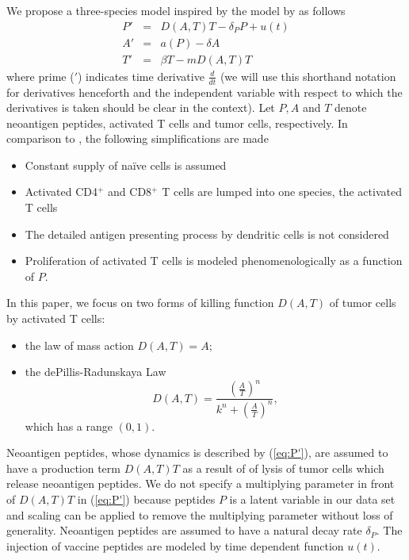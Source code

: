 \documentclass[review,authoryear]{elsarticle}
\begin{document}
We propose a three-species model inspired by the model by \cite{Messan2021} as follows
\begin{subequations}\label{eq:3sp-model}
\begin{eqnarray} 
P' & = & D(A,T)T-\delta_{P}P+u(t)\label{eq:P'}\\
A' & = & a(P)-\delta A\label{eq:A'}\\
T' & = & \beta T-mD(A,T)T\label{eq:T'}
\end{eqnarray}
\end{subequations}
where prime ($'$) indicates time derivative $\frac{d}{dt}$ (we will
use this shorthand notation for derivatives henceforth and the independent
variable with respect to which the derivatives is taken should be
clear in the context). Let $P, A$ and $T$ denote neoantigen peptides,
activated T cells and tumor cells, respectively. In comparison to \cite{Messan2021},
the following simplifications are made
\begin{itemize}
\item Constant supply of na\"ive cells is assumed 
\item Activated CD4$^{+}$ and CD8$^{+}$ T cells are lumped into one species, the activated T cells 
\item The detailed antigen presenting process by dendritic cells is not considered
\item Proliferation of activated T cells is modeled phenomenologically
as a function of $P$.
\end{itemize}

In this paper, we focus on two forms of killing function $D(A,T)$ of tumor cells by activated T cells:
\begin{itemize}
\item the law of mass action $D(A,T)=A$;
\item the dePillis-Radunskaya Law 
\begin{equation}
D(A,T)=\frac{(\frac{A}{T})^{n}}{k^{n}+(\frac{A}{T})^{n}}, \label{eq:PR law-1}
\end{equation}
which has a range $(0,1)$. 
\end{itemize}

Neoantigen peptides, whose dynamics is described by (\ref{eq:P'}), are assumed to have a production term $D(A,T)T$ as a result of of lysis of tumor cells which release neoantigen peptides\citep{Konstorum2017}. We do not specify a multiplying parameter in front of $D(A,T)T$ in
(\ref{eq:P'}) because peptides $P$ is a latent variable in our data set and scaling
can be applied to remove the multiplying parameter without loss of
generality. Neoantigen peptides are assumed to have a natural decay rate $\delta_P$. The injection of vaccine peptides are modeled by time dependent function $u(t)$.
\end{document}
